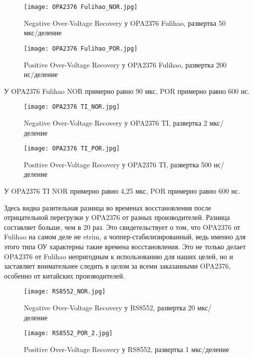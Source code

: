 \begin{figure}[H]
\centering
\texttt{[image: OPA2376 Fulihao\_NOR.jpg]}
\caption{Negative Over-Voltage Recovery у OPA2376 Fulihao, развертка 50 мкс/деление}
\label{ris:417}
\end{figure}

\begin{figure}[H]
\centering
\texttt{[image: OPA2376 Fulihao\_POR.jpg]}
\caption{Positive Over-Voltage Recovery у OPA2376 Fulihao, развертка 200 нс/деление}
\label{ris:418}
\end{figure}

У OPA2376 Fulihao NOR примерно равно 90 мкс,
POR примерно равно 600 нс.

\begin{figure}[H]
\centering
\texttt{[image: OPA2376 TI\_NOR.jpg]}
\caption{Negative Over-Voltage Recovery у OPA2376 TI, развертка 2 мкс/деление}
\label{ris:419}
\end{figure}

\begin{figure}[H]
\centering
\texttt{[image: OPA2376 TI\_POR.jpg]}
\caption{Positive Over-Voltage Recovery у OPA2376 TI, развертка 500 нс/деление}
\label{ris:420}
\end{figure}

У OPA2376 TI NOR примерно равно 4,25 мкс, 
POR примерно равно 600 нс. 

Здесь видна разительная разница во временах восстановления после отрицательной перегрузки у OPA2376 от 
разных производителей. Разница составляет больше, чем в 20 раз. Это свидетельствует о том, что OPA2376 от 
Fulihao на самом деле не etrim, а чоппер-стабилизированный, ведь именно для этого типа ОУ характерны такие 
времена восстановления.
Это не только делает OPA2376 от Fulihao непригодным к использованию для наших целей, но и заставляет 
внимательнее следить в целом за всеми заказанными OPA2376, особенно от китайских производителей.

\begin{figure}[H]
\centering
\texttt{[image: RS8552\_NOR.jpg]}
\caption{Negative Over-Voltage Recovery у RS8552, развертка 20 мкс/деление}
\label{ris:421}
\end{figure}

\begin{figure}[H]
\centering
\texttt{[image: RS8552\_POR\_2.jpg]}
\caption{Positive Over-Voltage Recovery у RS8552, развертка 1 мкс/деление}
\label{ris:422}
\end{figure}

